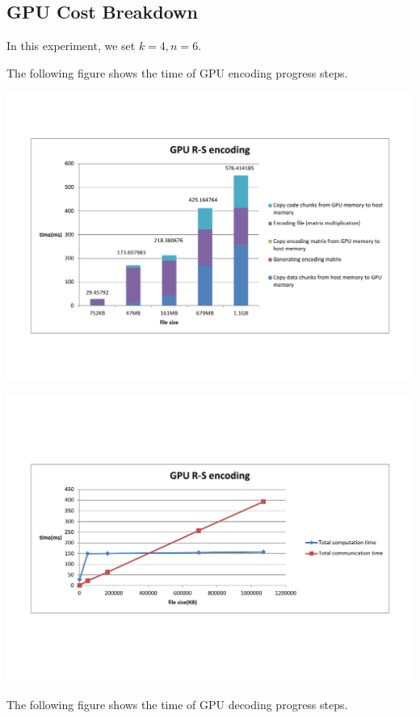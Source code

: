 \documentclass[a4paper]{article}
\begin{document}
\subsection{GPU Cost Breakdown}

In this experiment, we set $k=4, n=6$.

The following figure shows the time of GPU encoding progress steps.

\includegraphics[scale=0.48]{result-graph/GPU-encode-steps.pdf}

\includegraphics[scale=0.42]{result-graph/GPU-RS-encode.pdf}

The following figure shows the time of GPU decoding progress steps.
\end{document}
